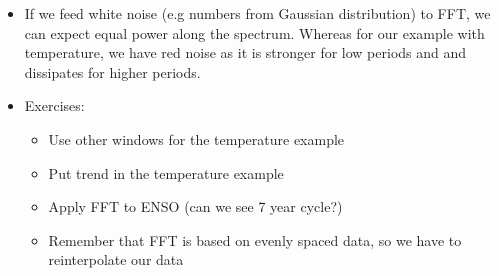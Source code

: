 \documentclass{article}
\begin{document}
\begin{itemize}
    \item If we feed white noise (e.g numbers from Gaussian distribution) to FFT, we can expect equal power along the spectrum. Whereas for our example with temperature, we have red noise as it is stronger for low periods and and dissipates for higher periods.
    \item Exercises:
    \begin{itemize}
        \item Use other windows for the temperature example
        \item Put trend in the temperature example
        \item Apply FFT to ENSO (can we see 7 year cycle?)
        \item Remember that FFT is based on evenly spaced data, so we have to reinterpolate our data
    \end{itemize}
\end{itemize}
\end{document}
